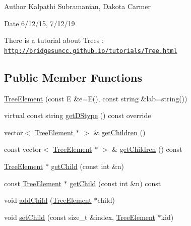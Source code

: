 \begin{DoxyAuthor}{Author}
Kalpathi Subramanian, Dakota Carmer 
\end{DoxyAuthor}
\begin{DoxyDate}{Date}
6/12/15, 7/12/19
\end{DoxyDate}
There is a tutorial about Trees \+: \href{http://bridgesuncc.github.io/tutorials/Tree.html}{\tt http\+://bridgesuncc.\+github.\+io/tutorials/\+Tree.\+html} \subsection*{Public Member Functions}
\begin{DoxyCompactItemize}
\item 
\hyperlink{classbridges_1_1datastructure_1_1_tree_element_a0d719458938ba46a509635591ba2290b}{Tree\+Element} (const E \&e=E(), const string \&lab=string())
\item 
virtual const string \hyperlink{classbridges_1_1datastructure_1_1_tree_element_a897f34ea284da45e1dc869c3e3b6c9a4}{get\+D\+Stype} () const override
\item 
vector$<$ \hyperlink{classbridges_1_1datastructure_1_1_tree_element}{Tree\+Element} $\ast$ $>$ \& \hyperlink{classbridges_1_1datastructure_1_1_tree_element_a3ea19ec0178ceb531a707d87d6fd42d3}{get\+Children} ()
\item 
const vector$<$ \hyperlink{classbridges_1_1datastructure_1_1_tree_element}{Tree\+Element} $\ast$ $>$ \& \hyperlink{classbridges_1_1datastructure_1_1_tree_element_a1fc634a6eaab3800f925429ace209469}{get\+Children} () const
\item 
\hyperlink{classbridges_1_1datastructure_1_1_tree_element}{Tree\+Element} $\ast$ \hyperlink{classbridges_1_1datastructure_1_1_tree_element_a7b4c553cd11b169fa4ab5c3dacc371a1}{get\+Child} (const int \&n)
\item 
const \hyperlink{classbridges_1_1datastructure_1_1_tree_element}{Tree\+Element} $\ast$ \hyperlink{classbridges_1_1datastructure_1_1_tree_element_a858d9ce29eb7256d058e8ee2daf4ef4f}{get\+Child} (const int \&n) const
\item 
void \hyperlink{classbridges_1_1datastructure_1_1_tree_element_a4c05db5e970707e1421fe664bc4ef3b7}{add\+Child} (\hyperlink{classbridges_1_1datastructure_1_1_tree_element}{Tree\+Element} $\ast$child)
\item 
void \hyperlink{classbridges_1_1datastructure_1_1_tree_element_ad894ec5edfa66ddf59dd83a8712b48f1}{set\+Child} (const size\+\_\+t \&index, \hyperlink{classbridges_1_1datastructure_1_1_tree_element}{Tree\+Element} $\ast$kid)
\end{DoxyCompactItemize}

